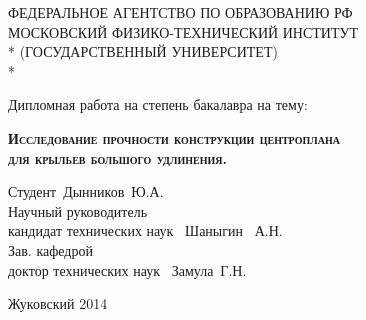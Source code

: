 \begin{titlepage}
\newpage		

\begin{center}
ФЕДЕРАЛЬНОЕ АГЕНТСТВО ПО ОБРАЗОВАНИЮ РФ \\
\vspace{1cm}
МОСКОВСКИЙ ФИЗИКО-ТЕХНИЧЕСКИЙ ИНСТИТУТ \\*
(ГОСУДАРСТВЕННЫЙ УНИВЕРСИТЕТ) \\*
\hrulefill
\end{center}
 
\vspace{8em}

\begin{center}
\Large Дипломная работа на степень бакалавра на тему:
\end{center}

\vspace{2.5em}
 
\begin{center}
\textsc{\textbf{Исследование прочности конструкции центроплана \\ для крыльев большого удлинения.}}
\end{center}

\vspace{6em}
 
\begin{flushleft}
Студент\hrulefill ~Дынников~Ю.А. \\
\vspace{1.5em}
Научный руководитель \\
кандидат технических наук \hrulefill ~Шаныгин~ А.Н.\\
\vspace{1.5em}
Зав. кафедрой\\
доктор технических наук \hrulefill ~Замула~Г.Н.
\end{flushleft}
 
\vspace{\fill}

\begin{center}
Жуковский 2014
\end{center}

\end{titlepage}